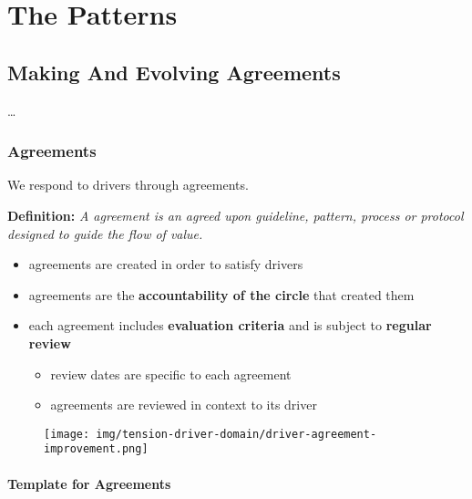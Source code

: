 \part{The Patterns}
\label{thepatterns}

\chapter{Making And Evolving Agreements}
\label{makingandevolvingagreements}

{\ldots}

\section{Agreements}
\label{agreements}

We respond to drivers through agreements.

\textbf{Definition:} \emph{A agreement is an agreed upon guideline, pattern, process or protocol designed to guide the flow of value.}

\begin{itemize}
\item agreements are created in order to satisfy drivers

\item agreements are the \textbf{accountability of the circle} that created them

\item each agreement includes \textbf{evaluation criteria} and is subject to \textbf{regular review}

\begin{itemize}
\item review dates are specific to each agreement

\item agreements are reviewed in context to its driver

\end{itemize}

\end{itemize}

\begin{figure}[htbp]
\centering
\texttt{[image: img/tension-driver-domain/driver-agreement-improvement.png]}
\end{figure}

\subsection{Template for Agreements}
\label{templateforagreements}

